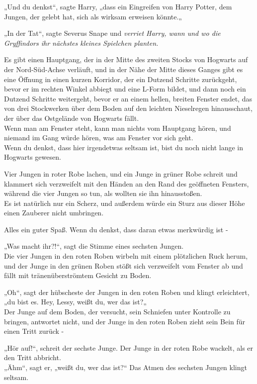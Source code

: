 {„Und du denkst“, sagte Harry, „dass ein Eingreifen von Harry Potter, dem Jungen, der gelebt hat, sich als wirksam erweisen könnte.„

„In der Tat“, sagte Severus Snape und \emph{verriet Harry, wann und wo die Gryffindors ihr nächstes kleines Spielchen planten.}

\hfill\break Es gibt einen Hauptgang, der in der Mitte des zweiten Stocks von Hogwarts auf der Nord-Süd-Achse verläuft, und in der Nähe der Mitte dieses Ganges gibt es eine Öffnung in einen kurzen Korridor, der ein Dutzend Schritte zurückgeht, bevor er im rechten Winkel abbiegt und eine L-Form bildet, und dann noch ein Dutzend Schritte weitergeht, bevor er an einem hellen, breiten Fenster endet, das von drei Stockwerken über dem Boden auf den leichten Nieselregen hinausschaut, der über das Ostgelände von Hogwarts fällt.\\ Wenn man am Fenster steht, kann man nichts vom Hauptgang hören, und niemand im Gang würde hören, was am Fenster vor sich geht.\\ Wenn du denkst, dass hier irgendetwas seltsam ist, bist du noch nicht lange in Hogwarts gewesen.

Vier Jungen in roter Robe lachen, und ein Junge in grüner Robe schreit und klammert sich verzweifelt mit den Händen an den Rand des geöffneten Fensters, während die vier Jungen so tun, als wollten sie ihn hinausstoßen.\\ Es ist natürlich nur ein Scherz, und außerdem würde ein Sturz aus dieser Höhe einen Zauberer nicht umbringen.

Alles ein guter Spaß. Wenn du denkst, dass daran etwas merkwürdig ist -

„Was macht ihr?!“, sagt die Stimme eines sechsten Jungen.\\ Die vier Jungen in den roten Roben wirbeln mit einem plötzlichen Ruck herum, und der Junge in den grünen Roben stößt sich verzweifelt vom Fenster ab und fällt mit tränenüberströmtem Gesicht zu Boden.

„Oh“, sagt der hübscheste der Jungen in den roten Roben und klingt erleichtert,\\ „du bist es. Hey, Lessy, weißt du, wer das ist?„\\ Der Junge auf dem Boden, der versucht, sein Schniefen unter Kontrolle zu bringen, antwortet nicht, und der Junge in den roten Roben zieht sein Bein für einen Tritt zurück -

„Hör auf!“, schreit der sechste Junge. Der Junge in der roten Robe wackelt, als er den Tritt abbricht.\\ „Ähm“, sagt er, „weißt du, wer das ist?“ Das Atmen des sechsten Jungen klingt seltsam.

}
